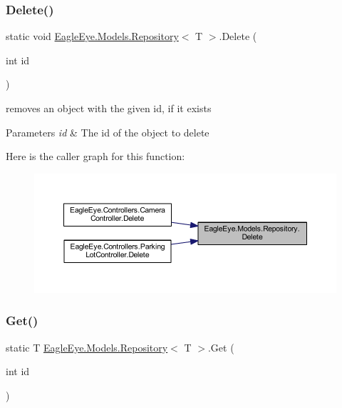 \subsubsection{\texorpdfstring{Delete()}{Delete()}}
{\footnotesize\ttfamily static void \mbox{\hyperlink{class_eagle_eye_1_1_models_1_1_repository}{Eagle\+Eye.\+Models.\+Repository}}$<$ T $>$.Delete (\begin{DoxyParamCaption}\item[{int}]{id }\end{DoxyParamCaption})\hspace{0.3cm}{\ttfamily [static]}}



removes an object with the given id, if it exists 


\begin{DoxyParams}{Parameters}
{\em id} & The id of the object to delete\\
\hline
\end{DoxyParams}
Here is the caller graph for this function\+:\nopagebreak
\begin{figure}[H]
\begin{center}
\leavevmode
\includegraphics[width=350pt]{class_eagle_eye_1_1_models_1_1_repository_ad50f201c8f5f1c7794ddf068ed459854_icgraph}
\end{center}
\end{figure}
\mbox{\label{class_eagle_eye_1_1_models_1_1_repository_ac44cb18d8cbb605d3f7e14eb09c8c0bf}} 
\subsubsection{\texorpdfstring{Get()}{Get()}}
{\footnotesize\ttfamily static T \mbox{\hyperlink{class_eagle_eye_1_1_models_1_1_repository}{Eagle\+Eye.\+Models.\+Repository}}$<$ T $>$.Get (\begin{DoxyParamCaption}\item[{int}]{id }\end{DoxyParamCaption})\hspace{0.3cm}{\ttfamily [static]}}



